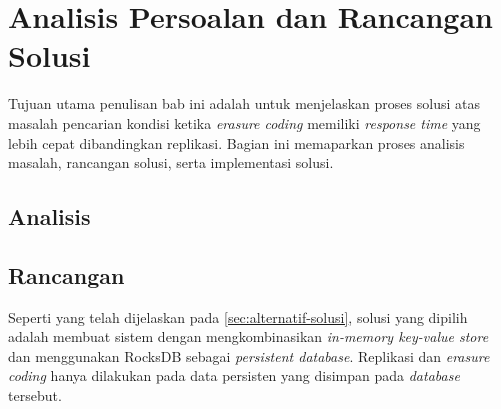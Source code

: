 \chapter{Analisis Persoalan dan Rancangan Solusi}
\label{chapter:analisis-persoalan-dan-rancangan-solusi}

Tujuan utama penulisan bab ini adalah untuk menjelaskan proses solusi atas masalah pencarian kondisi ketika \textit{erasure coding} memiliki \textit{response time} yang lebih cepat dibandingkan replikasi. Bagian ini memaparkan proses analisis masalah, rancangan solusi, serta implementasi solusi.


\section{Analisis}







\section{Rancangan}

Seperti yang telah dijelaskan pada \ref{sec:alternatif-solusi}, solusi yang dipilih adalah membuat sistem dengan mengkombinasikan \textit{in-memory key-value store} dan menggunakan RocksDB sebagai \textit{persistent database}. Replikasi dan \textit{erasure coding} hanya dilakukan pada data persisten yang disimpan pada \textit{database} tersebut.








